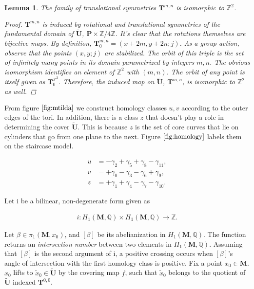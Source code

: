 \documentclass[]{article}
\newtheorem{lem}{Lemma}[section]
\begin{document}
\begin{lem}
The family of translational symmetries $\mathbf{T}^{m,n}$ is isomorphic to $\mathbb Z^2$.
\begin{proof}
$\mathbf{T}^{m,n}$ is induced by rotational and translational symmetries of the fundamental domain of $\tilde{\mathbf{U}}$, $\mathbf P \times \mathbb{Z}/4\mathbb{Z}$. It's clear that the rotations themselves are bijective maps. By definition, $\mathbf{T}_0^{m,n}=(x+2m,y+2n;j)$. As a group action, observe that the points $(x,y;j)$ are stabilized. The orbit of this triple is the set of infinitely many points in its domain parametrized by integers $m,n$. The obvious isomorphism identifies an element of $\mathbb{Z}^2$ with $(m,n)$. The orbit of any point is itself given as $\mathbf{T}_0^{\mathbb Z^2}$. Therefore, the induced map on $\tilde{\mathbf{U}}$, $\mathbf{T}^{m,n}$, is isomorphic to $\mathbb Z^2$ as well.
\end{proof}
\end{lem}

From figure $\ref{fig:mtilda}$ we construct homology classes $u,v$ according to the outer edges of the tori. In addition, there is a class $z$ that doesn't play a role in determining the cover $\tilde{\mathbf U}$. This is because $z$ is the set of core curves that lie on cylinders that go from one plane to the next. Figure $\ref{fig:homology}$ labels them on the staircase model.

\begin{align*}
u &= -\gamma_2 +\gamma_5 + \gamma_8 - \gamma_{11},\\
v &= +\gamma_0 -\gamma_3 -\gamma_6 +\gamma_9,\\
z &= +\gamma_1 +\gamma_4-\gamma_7-\gamma_{10}.
\end{align*}

Let i be a bilinear, non-degenerate form given as

\begin{align}
i:H_1(\mathbf{M},\mathbb Q)\times H_1(\mathbf{M},\mathbb Q)\rightarrow \mathbb Z.
\end{align}

Let $\beta\in \pi_1(\mathbf{M}, x_0)$, and $[\beta]$ be its abelianization in $H_1(\mathbf{M},\mathbb{Q})$.
The function returns an \emph{intersection number} between two elements in $H_1(\mathbf{M},\mathbb Q)$. Assuming that $[\beta]$ is the second argument of i, a positive crossing occurs when $[\beta]$'s angle of intersection with the first homology class is positive. Fix a point $x_0\in\mathbf{M}$. $x_0$ lifts to $\tilde{x}_0\in\tilde{\mathbf{U}}$ by the covering map $f$, such that $\tilde{x}_0$ belongs to the quotient of $\tilde{\mathbf{U}}$ indexed $\mathbf{T}^{0,0}$.
\end{document}
